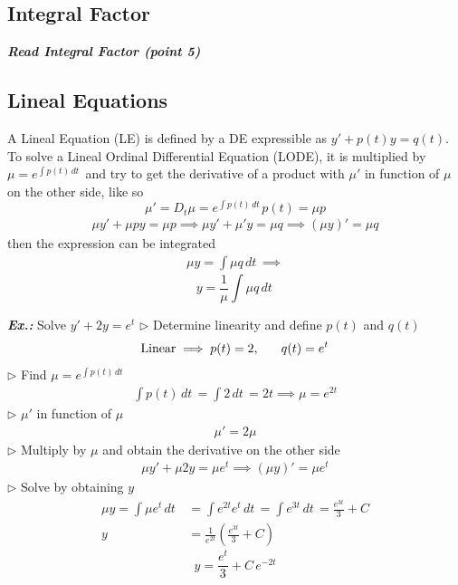 \documentclass[a4paper]{article}
\begin{document}
\subsection{Integral Factor}
\textbf{\textit{Read Integral Factor (point 5)}}

\subsection{Lineal Equations}
A Lineal Equation (LE) is defined by a DE expressible as $y'+p(t)y=q(t)$. To solve a Lineal Ordinal Differential Equation (LODE), it is multiplied by $\mu=e^{ \int p(t) \, dt\, }$  and try to get the derivative of a product with $\mu'$ in function of $\mu$ on the other side, like so
$$
\mu'=D_{t}\mu=e^{ \int p(t) \, dt\,  }p(t)=\mu p
$$
\begin{align}
\mu y'+\mu py=\mu p\implies \mu y'+\mu'y=\mu q\implies(\mu y)'=\mu q
\end{align}
then the expression can be integrated
\begin{align}
\mu y=\int \mu q \, dt\, \implies
\end{align}
$$
\boxed{y=\frac{1}{\mu}\int \mu q \, dt\, }
$$
\vspace{1ex}\vspace{1ex}

\vspace{2ex}\textbf{\textit{Ex.: }}Solve $y'+2y=e^{t}$
$\triangleright$ Determine linearity and define $p(t)$ and $q(t)$
$$
\text{Linear}\implies p(t)=2,\hspace{4ex}q(t)=e^{ t }
$$
$\triangleright$ Find $\mu=e^{ \int p(t) \, dt\, }$
\begin{align}
\int p(t) \, dt\, =\int 2 \, dt\, =2t\implies \mu=e^{ 2t }
\end{align}
$\triangleright$ $\mu'$ in function of $\mu$
\begin{align}
\mu'=2\mu
\end{align}
$\triangleright$ Multiply by $\mu$ and obtain the derivative on the other side
\begin{align}
\mu y'+\mu 2y=\mu e^{ t }\implies(\mu y)'=\mu e^{ t }
\end{align}
$\triangleright$ Solve by obtaining $y$
\begin{align}
\mu y=\int \mu e^{ t } \, dt\, &=\int e^{ 2t }e^{ t } \, dt\, =\int e^{ 3t } \, dt\, =\frac{e^{ 3t }}{3}+C \\
y&=\frac{1}{e^{ 2t }}\left( \frac{e^{ 3t }}{3}+C \right)
\end{align}
$$
\boxed{y=\frac{e^{ t }}{3}+C\,e^{ -2t }}
$$
\end{document}
